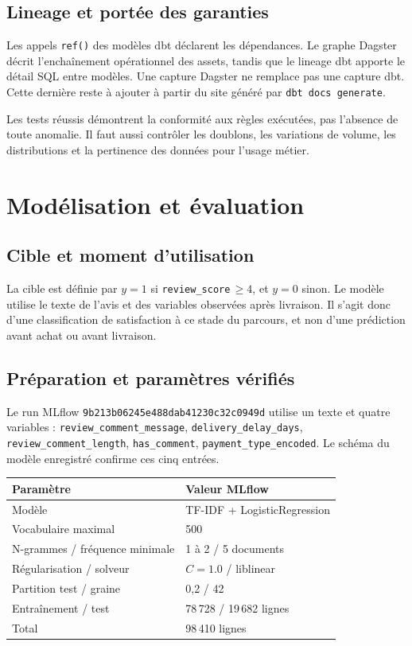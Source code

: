 \documentclass[11pt,a4paper]{report}
\newcommand{\code}[1]{\nolinkurl{#1}}
\begin{document}
\section{Lineage et portée des garanties}
Les appels \code{ref()} des modèles dbt déclarent les dépendances. Le graphe Dagster décrit l'enchaînement opérationnel des assets, tandis que le lineage dbt apporte le détail SQL entre modèles. Une capture Dagster ne remplace pas une capture dbt. Cette dernière reste à ajouter à partir du site généré par \code{dbt docs generate}.

Les tests réussis démontrent la conformité aux règles exécutées, pas l'absence de toute anomalie. Il faut aussi contrôler les doublons, les variations de volume, les distributions et la pertinence des données pour l'usage métier.

\chapter{Modélisation et évaluation}
\section{Cible et moment d'utilisation}
La cible est définie par $y=1$ si \code{review_score}\,$\geq4$, et $y=0$ sinon. Le modèle utilise le texte de l'avis et des variables observées après livraison. Il s'agit donc d'une classification de satisfaction à ce stade du parcours, et non d'une prédiction avant achat ou avant livraison.

\section{Préparation et paramètres vérifiés}
Le run MLflow \code{9b213b06245e488dab41230c32c0949d} utilise un texte et quatre variables : \code{review_comment_message}, \code{delivery_delay_days}, \code{review_comment_length}, \code{has_comment}, \code{payment_type_encoded}. Le schéma du modèle enregistré confirme ces cinq entrées.

\par\noindent\begin{tabularx}{\linewidth}{Y Y}\toprule
\textbf{Paramètre} & \textbf{Valeur MLflow}\\\midrule
Modèle & TF-IDF + LogisticRegression\\
Vocabulaire maximal & 500\\
N-grammes / fréquence minimale & 1 à 2 / 5 documents\\
Régularisation / solveur & $C=1.0$ / liblinear\\
Partition test / graine & 0,2 / 42\\
Entraînement / test & 78\,728 / 19\,682 lignes\\
Total & 98\,410 lignes\\\bottomrule
\end{tabularx}
\end{document}
